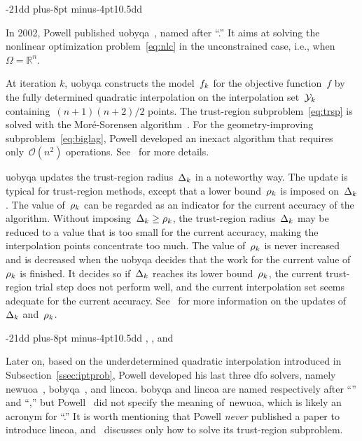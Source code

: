 \documentclass[smallextended]{svjour3}
\makeatletter
\newcommand{\R}{\mathbb{R}}
\newcommand{\fset}{\Omega}
\newcommand{\objm}[1][k]{\obj\ifthenelse{\equal{#1}{}}{}{_{#1}}}
\newcommand{\obj}{f}
\newcommand{\radlb}[1][k]{\rho\ifthenelse{\equal{#1}{}}{}{_{#1}}}
\newcommand{\rad}[1][k]{\Delta\ifthenelse{\equal{#1}{}}{}{_{#1}}}
\newcommand{\xpt}[1][k]{\mathcal{Y}\ifthenelse{\equal{#1}{}}{}{_{#1}}}
\def\subsection{\@startsection{subsection}{2}{\z@}%
    {-21dd plus-8pt minus-4pt}{10.5dd}
    {\normalsize\bfseries}}
\makeatother
\begin{document}
\subsection{}
\label{ssec:uobyqa}

In 2002, Powell published \gls{uobyqa}~\cite{Powell_2002}, named after ``.''
It aims at solving the nonlinear optimization problem~\eqref{eq:nlc} in the unconstrained case, i.e., when~$\fset = \R^n$.

At iteration $k$, \gls{uobyqa} constructs the model~$\objm$ for the objective function~$\obj$ by the fully determined quadratic interpolation on the interpolation set~$\xpt$ containing~$(n + 1)(n + 2) / 2$ points.
The trust-region subproblem~\eqref{eq:trsp} is solved with the Mor{\'{e}}-Sorensen algorithm~\cite{More_Sorensen_1983}.
For the geometry-improving subproblem~\eqref{eq:biglag}, Powell developed an inexact algorithm that requires only~$\mathcal{O}(n^2)$ operations.
See~\cite[\S~2]{Powell_2002} for more details.

\Gls{uobyqa} updates the trust-region radius~$\rad$ in a noteworthy way.
The update is typical for trust-region methods, except that a lower bound~$\radlb$ is imposed on~$\rad$.
The value of~$\radlb[k]$ can be regarded as an indicator for the current accuracy of the algorithm.
Without imposing~$\rad[k] \ge \radlb[k]$, the trust-region radius~$\rad[k]$ may be reduced to a value that is too small for the current accuracy, making the interpolation points concentrate too much.
The value of~$\radlb[k]$ is never increased and is decreased when the \gls{uobyqa} decides that the work for the current value of~$\radlb[k]$ is finished.
It decides so if~$\rad[k]$ reaches its lower bound~$\radlb[k]$, the current trust-region trial step does not perform well, and the current interpolation set seems adequate for the current accuracy.
See~\cite[\S~3]{Powell_2002} for more information on the updates of~$\rad$ and~$\radlb[k]$.

\subsection{, , and }
\label{ssec:nbloa}

Later on, based on the underdetermined quadratic interpolation introduced in Subsection~\ref{ssec:iptprob}, Powell developed his last three \gls{dfo} solvers, namely \gls{newuoa}~\cite{Powell_2006,Powell_2008}, \gls{bobyqa}~\cite{Powell_2009}, and \gls{lincoa}.
\Gls{bobyqa} and \gls{lincoa} are named respectively after ``'' and ``,'' but Powell~\cite{Powell_2006,Powell_2008} did not specify the meaning of~\gls{newuoa}, which is likely an acronym for ``.''
It is worth mentioning that Powell \emph{never} published a paper to introduce \gls{lincoa}, and~\cite{Powell_2015} discusses only how to solve its trust-region subproblem.
\end{document}
